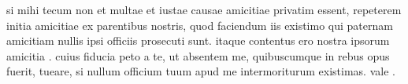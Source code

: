 


 si mihi tecum non et multae et iustae causae amicitiae privatim essent, repeterem initia amicitiae ex parentibus nostris, quod faciendum iis existimo qui paternam amicitiam nullis ipsi officiis prosecuti sunt. itaque contentus ero nostra ipsorum amicitia . cuius fiducia peto a te, ut absentem me, quibuscumque in rebus opus fuerit, tueare, si nullum officium tuum apud me intermoriturum existimas. vale .
